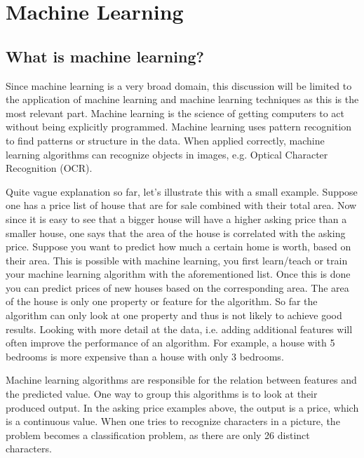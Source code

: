 \chapter{Machine Learning}
{\samenvatting }


\section{What is machine learning?}
Since machine learning is a very broad domain, this discussion will be limited to the application of machine learning and machine learning techniques as this is the most relevant part. Machine learning is the science of getting computers to act without being explicitly programmed. Machine learning uses pattern recognition to find patterns or structure in the data. When applied correctly, machine learning algorithms can recognize objects in images, e.g. Optical Character Recognition (OCR).

\npar

Quite vague explanation so far, let's illustrate this with a small example. Suppose one has a price list of house that are for sale combined with their total area. Now since it is easy to see that a bigger house will have a higher asking price than a smaller house, one says that the area of the house is correlated with the asking price. Suppose you want to predict how much a certain home is worth, based on their area. This is possible with machine learning, you first learn/teach or train your machine learning algorithm with the aforementioned list. Once this is done you can predict prices of new houses based on the corresponding area. The area of the house is only one property or feature for the algorithm. So far the algorithm can only look at one property and thus is not likely to achieve good results. Looking with more detail at the data, i.e. adding additional features will often improve the performance of an algorithm. For example, a house with 5 bedrooms is more expensive than a house with only 3 bedrooms.

\npar

Machine learning algorithms are responsible for the relation between features and the predicted value. One way to group this algorithms is to look at their produced output. In the asking price examples above, the output is a price, which is a continuous value. When one tries to recognize characters in a picture, the problem becomes a classification problem, as there are only 26 distinct characters. 

